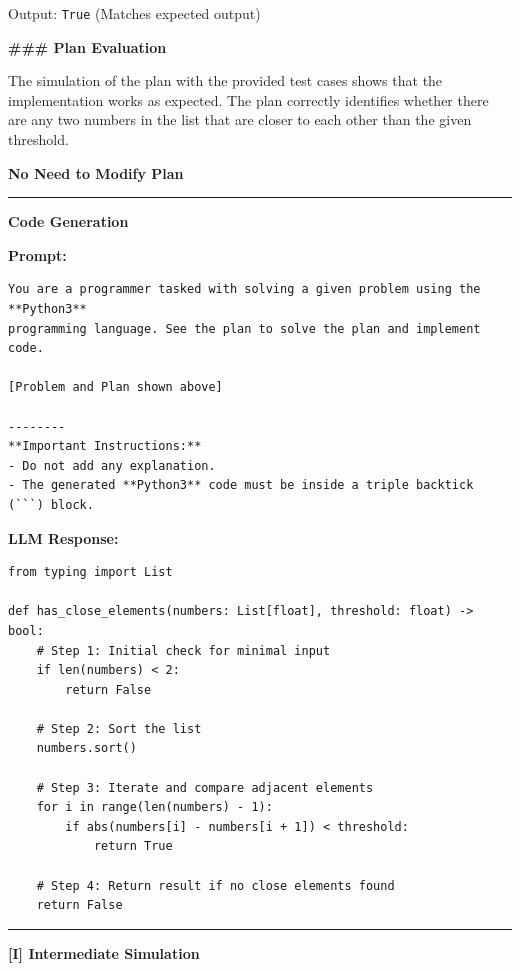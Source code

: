 \documentclass[11pt]{article}
\begin{document}
\begin{tcolorbox}[breakable, colback=white, colframe=black!70, boxrule=0.5pt, arc=2pt, left=4mm, right=4mm, top=3mm, bottom=3mm]
Output: \texttt{True} (Matches expected output)

\textbf{\#\#\# Plan Evaluation}

The simulation of the plan with the provided test cases shows that the implementation works as expected. The plan correctly identifies whether there are any two numbers in the list that are closer to each other than the given threshold.

\textbf{No Need to Modify Plan}

\vspace{0.5cm} \hrule \vspace{0.5cm}

\noindent\textbf{\Large Code Generation}

\textbf{Prompt:}
\begin{verbatim}
You are a programmer tasked with solving a given problem using the **Python3** 
programming language. See the plan to solve the plan and implement code.

[Problem and Plan shown above]

--------
**Important Instructions:**
- Do not add any explanation.
- The generated **Python3** code must be inside a triple backtick (```) block.
\end{verbatim}

\textbf{LLM Response:}

\begin{verbatim}
from typing import List

def has_close_elements(numbers: List[float], threshold: float) -> bool:
    # Step 1: Initial check for minimal input
    if len(numbers) < 2:
        return False
    
    # Step 2: Sort the list
    numbers.sort()
    
    # Step 3: Iterate and compare adjacent elements
    for i in range(len(numbers) - 1):
        if abs(numbers[i] - numbers[i + 1]) < threshold:
            return True
    
    # Step 4: Return result if no close elements found
    return False
\end{verbatim}

\vspace{0.5cm} \hrule \vspace{0.5cm}

\noindent\textbf{\Large [I] Intermediate Simulation}


\end{tcolorbox}
\end{document}
